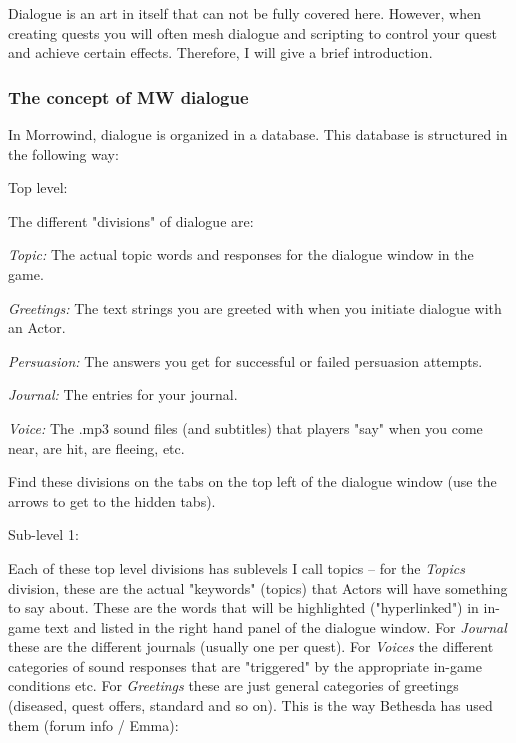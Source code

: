 Dialogue is an art in itself that can not be fully covered here.
However, when creating quests you will often mesh dialogue and scripting
to control your quest and achieve certain effects. Therefore, I will
give a brief introduction.

\hypertarget{the-concept-of-mw-dialogue}{%
\subsubsection{The concept of MW
dialogue}\label{the-concept-of-mw-dialogue}}

In Morrowind, dialogue is organized in a database. This database is
structured in the following way:

Top level:

The different "divisions" of dialogue are:

\emph{Topic:} The actual topic words and responses for the dialogue
window in the game.

\emph{Greetings:} The text strings you are greeted with when you
initiate dialogue with an Actor.

\emph{Persuasion:} The answers you get for successful or failed
persuasion attempts.

\emph{Journal:} The entries for your journal.

\emph{Voice:} The .mp3 sound files (and subtitles) that players "say"
when you come near, are hit, are fleeing, etc.

Find these divisions on the tabs on the top left of the dialogue window
(use the arrows to get to the hidden tabs).

Sub-level 1:

Each of these top level divisions has sublevels I call topics -- for the
\emph{Topics} division, these are the actual "keywords" (topics) that
Actors will have something to say about. These are the words that will
be highlighted ("hyperlinked") in in-game text and listed in the right
hand panel of the dialogue window. For \emph{Journal} these are the
different journals (usually one per quest). For \emph{Voices} the
different categories of sound responses that are "triggered" by the
appropriate in-game conditions etc. For \emph{Greetings} these are just
general categories of greetings (diseased, quest offers, standard and so
on). This is the way Bethesda has used them (forum info / Emma):

